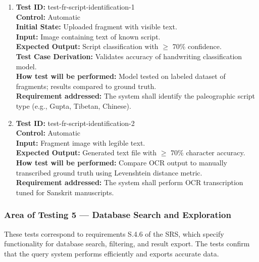 \documentclass[12pt, titlepage]{article}
\begin{document}
\begin{enumerate}
\item
\textbf{Test ID:} test-fr-script-identification-1\\
\textbf{Control:} Automatic\\
\textbf{Initial State:} Uploaded fragment with visible text.\\
\textbf{Input:} Image containing text of known script.\\
\textbf{Expected Output:} Script classification with $\geq$ 70\% confidence.\\
\textbf{Test Case Derivation:} Validates accuracy of handwriting classification model.\\
\textbf{How test will be performed:} Model tested on labeled dataset of fragments; results compared to ground truth.\\
\textbf{Requirement addressed:} The system shall identify the paleographic script type (e.g., Gupta, Tibetan, Chinese).\\

\item
\textbf{Test ID:} test-fr-script-identification-2\\
\textbf{Control:} Automatic\\
\textbf{Input:} Fragment image with legible text.\\
\textbf{Expected Output:} Generated text file with $\geq$ 70\% character accuracy.\\
\textbf{How test will be performed:} Compare OCR output to manually transcribed ground truth using Levenshtein distance metric.\\
\textbf{Requirement addressed:} The system shall perform OCR transcription tuned for Sanskrit manuscripts.\\
\end{enumerate}

\subsubsection{Area of Testing 5 — Database Search and Exploration}

These tests correspond to requirements S.4.6 of the SRS, which specify functionality for database search, filtering, and result export. The tests confirm that the query system performs efficiently and exports accurate data.
\end{document}
